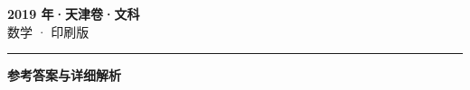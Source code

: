 \documentclass[zihao=5, a4paper]{ctexart}
\begin{document}
\begin{center}
  {\Large\bfseries 2019 年·天津卷·文科}\\[4pt]
  {\large 数学 · 印刷版}
\end{center}
\medskip
{}

\par\bigskip\hrule\bigskip
{}
\begin{center}{\large\bfseries 参考答案与详细解析}\end{center}
\smallskip

\end{document}

